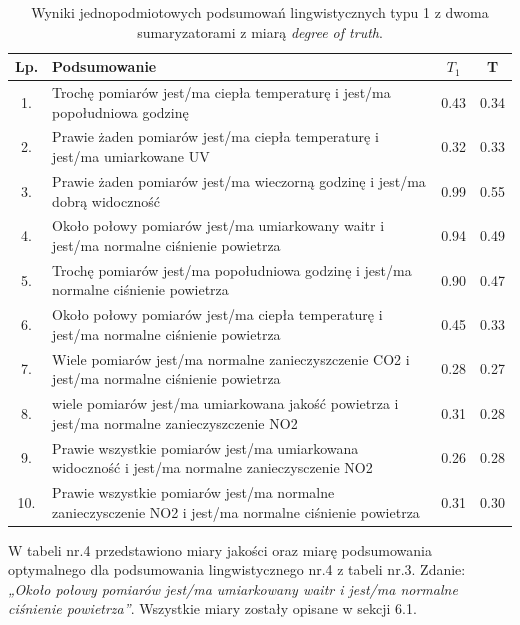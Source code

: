 \documentclass{article}
\begin{document}
\begin{table}[H]
\begin{center}
\normalsize %
\begin{tabular}{|c|p{8cm}|c|c|} %
\hline
\textbf{Lp.} & \textbf{Podsumowanie} & \textbf{\(T_1\)} & \textbf{T} \\ \hline
1. & Trochę pomiarów jest/ma ciepła temperaturę i jest/ma popołudniowa godzinę & 0.43 & 0.34 \\ \hline
2. & Prawie żaden pomiarów jest/ma ciepła temperaturę i jest/ma umiarkowane UV & 0.32 & 0.33 \\ \hline
3. & Prawie żaden pomiarów jest/ma wieczorną godzinę i jest/ma dobrą widoczność & 0.99 & 0.55 \\ \hline
4. & Około połowy pomiarów  jest/ma umiarkowany waitr i jest/ma normalne ciśnienie powietrza & 0.94 & 0.49 \\ \hline
5. & Trochę pomiarów jest/ma popołudniowa godzinę i jest/ma normalne ciśnienie powietrza & 0.90 & 0.47 \\ \hline
6. & Około połowy pomiarów jest/ma ciepła temperaturę i jest/ma normalne ciśnienie  powietrza & 0.45 & 0.33 \\ \hline
7. & Wiele pomiarów  jest/ma normalne zanieczyszczenie CO2 i jest/ma normalne ciśnienie powietrza & 0.28 & 0.27 \\ \hline
8. & wiele pomiarów  jest/ma umiarkowana jakość powietrza i jest/ma normalne zanieczyszczenie NO2 & 0.31 & 0.28 \\ \hline
9. & Prawie wszystkie pomiarów  jest/ma umiarkowana widoczność i jest/ma normalne zanieczysczenie NO2 & 0.26 & 0.28 \\ \hline
10. & Prawie wszystkie pomiarów  jest/ma normalne zanieczysczenie NO2 i jest/ma normalne ciśnienie powietrza & 0.31 & 0.30 \\ \hline
\end{tabular}
\caption{Wyniki jednopodmiotowych podsumowań lingwistycznych typu 1 z dwoma sumaryzatorami z miarą \textit{degree of truth}.}
\end{center}
\end{table}

W tabeli nr.4 przedstawiono miary jakości oraz miarę podsumowania optymalnego dla podsumowania lingwistycznego nr.4 z tabeli nr.3. Zdanie: \textit{„Około połowy pomiarów  jest/ma umiarkowany waitr i jest/ma normalne ciśnienie powietrza”}. Wszystkie miary zostały opisane w sekcji 6.1.
\end{document}
